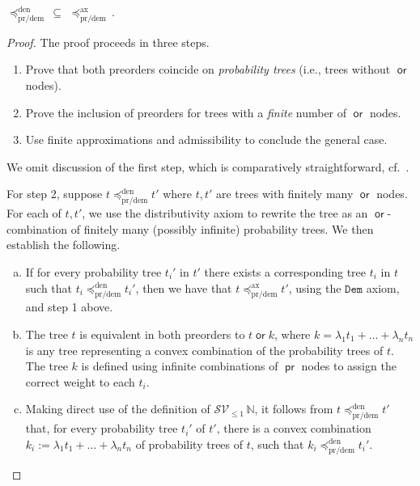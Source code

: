 \documentclass[a4paper,UKenglish]{lipics-v2018}
\newcommand{\Basicleq}{\preccurlyeq}
\newcommand{\prEff}{\operatorname{\textsf{pr}}}
\newcommand{\orEff}{\operatorname{\textsf{or}}}
\newcommand{\prdem}{\text{pr/dem}}
\newcommand{\Den}{\text{den}}
\newcommand{\Ax}{\text{ax}}
\theoremstyle{plain}
\begin{document}
\begin{lemma}
\label{lemma:completeness}
${\Basicleq^\Den_\prdem} \, \subseteq \, \, \Basicleq^\Ax_\prdem\,$.
\end{lemma}
\begin{proof}
The proof proceeds in three steps.
    \begin{enumerate}
        \item Prove that both preorders coincide 
            on \emph{probability trees} (i.e., trees without $\orEff$ nodes).
        \item Prove the inclusion of preorders for
             trees with a \emph{finite} number 
            of $\orEff$ nodes.
        \item Use finite approximations and admissibility
            to conclude the general case.
    \end{enumerate}

We omit discussion of the first step, which  is comparatively straightforward, cf.~\cite{heckmann}.

For step 2, suppose $t \Basicleq^\Den_\prdem t'$ where $t,t'$ are 
trees with finitely many $\orEff$ nodes. For each of $t, t'$, we use the distributivity axiom to rewrite the tree
          as an $\orEff$-combination of finitely many (possibly infinite) {probability trees}. We then establish the following.
    \begin{enumerate}[(a)]
         \item 
            If for every 
            probability
            tree $t_i'$ in $t'$ there exists 
            a corresponding tree $t_i$ in $t$ 
            such that $t_i \Basicleq^\Den_\prdem t_i'$,
            then we have that $t \Basicleq^\Ax_\prdem t'$, using the $\texttt{Dem}$ axiom, and  step 1 above.

        \item 
            The tree $t$ is equivalent  in both preorders  to 
            $t \orEff k$, where $k = \lambda_1t_1+ \dots + \lambda_n t_n$
            is any tree representing a convex combination of the probability trees of $t$.
            The tree $k$ is defined  using infinite combinations of $\prEff$ nodes to assign the correct weight to each $t_i$.
    
        \item Making direct use of the definition of $\mathcal{S}\mathcal{V}_{\leq 1}\, \mathbb{N}$, it follows from $t \Basicleq^\Den_\prdem t'$ that, for every
            probability tree   $t_i'$ of $t'$,
            there is a convex combination
            $k_i := \lambda_1t_1+ \dots + \lambda_n t_n$
            of probability trees of $t$,
                        such that $k_i \Basicleq^\Den_\prdem t_i'$.



\end{enumerate}
\end{proof}
\end{document}
